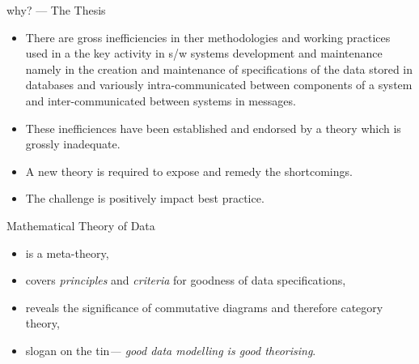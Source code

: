\begin{frame}{why? --- The Thesis}
\begin{itemize}[<+->]
  \item There are gross inefficiencies in ther methodologies and working practices used in  a the key activity in s/w systems development and maintenance namely in  the creation and maintenance of specifications of the data stored in databases and variously intra-communicated between components of a system and inter-communicated between systems in messages. 
  \item These inefficiences have been established and endorsed by a theory which is grossly inadequate.
  \item A new theory is required to expose and remedy the shortcomings.
  \item The challenge is positively impact best practice.
\end{itemize}
\end{frame}

\begin{frame}{Mathematical Theory of Data}
\begin{itemize}
\item is a meta-theory,
\item covers \textit{principles} and \textit{criteria} for goodness of data specifications,
\item reveals the significance of commutative diagrams and therefore category theory,
\item slogan on the tin\textit{--- good data modelling is good theorising}. 
\end{itemize}
\end{frame}


\fi

\iffalse




\fi




\iffalse



\fi

\iffalse
